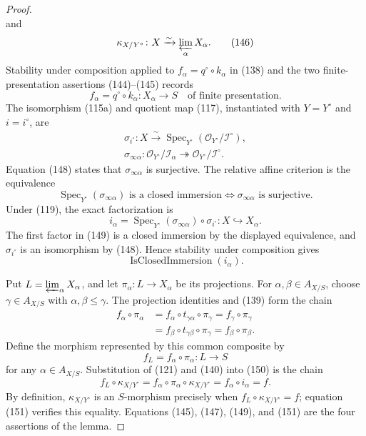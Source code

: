 \begin{proof}
\[  \]
  and
  \[
    \kappa_{X/Y^\circ}\colon X\xrightarrow{\sim}
      \varprojlim_\alpha X_\alpha.                             \tag{146}
  \]
  Stability under composition applied to
  $f_\alpha=q^\circ\circ k_\alpha$ in (138) and the two
  finite-presentation assertions (144)--(145) records
  \[
    f_\alpha=q^\circ\circ k_\alpha\colon X_\alpha\to S
      \quad\text{of finite presentation}.                      \tag{147}
  \]
  The isomorphism (115a) and quotient map (117), instantiated with
  $Y=Y^\circ$ and $i=i^\circ$, are
  \[
  \begin{gathered}
    \sigma_{i^\circ}\colon X\xrightarrow{\sim}
      \operatorname{Spec}_{Y^\circ}
        (\mathcal O_{Y^\circ}/\mathcal I^\circ),\\
    \sigma_{\infty\alpha}\colon
      \mathcal O_{Y^\circ}/\mathcal I_\alpha
      \twoheadrightarrow\mathcal O_{Y^\circ}/\mathcal I^\circ.
  \end{gathered}                                                  \tag{148}
  \]
  Equation (148) states that $\sigma_{\infty\alpha}$ is surjective.  The
  relative affine criterion is the equivalence
  \[
    \operatorname{Spec}_{Y^\circ}(\sigma_{\infty\alpha})
      \text{ is a closed immersion}
      \Longleftrightarrow
    \sigma_{\infty\alpha}\text{ is surjective}.
  \]
  Under (119), the exact factorization is
  \[
    i_\alpha
      =\operatorname{Spec}_{Y^\circ}(\sigma_{\infty\alpha})
         \circ\sigma_{i^\circ}\colon X\hookrightarrow X_\alpha. \tag{149}
  \]
  The first factor in (149) is a closed immersion by the displayed
  equivalence, and $\sigma_{i^\circ}$ is an isomorphism by (148).  Hence
  stability under composition gives
  \[
    \operatorname{IsClosedImmersion}(i_\alpha).
  \]

  Put $L=\varprojlim_\alpha X_\alpha$, and let
  $\pi_\alpha\colon L\to X_\alpha$ be its projections.  For
  $\alpha,\beta\in A_{X/S}$, choose
  $\gamma\in A_{X/S}$ with $\alpha,\beta\leq\gamma$.  The projection
  identities and (139) form the chain
  \[
  \begin{aligned}
    f_\alpha\circ\pi_\alpha
      &=f_\alpha\circ t_{\gamma\alpha}\circ\pi_\gamma
       =f_\gamma\circ\pi_\gamma\\
      &=f_\beta\circ t_{\gamma\beta}\circ\pi_\gamma
       =f_\beta\circ\pi_\beta.
  \end{aligned}
  \]
  Define the morphism represented by this common composite by
  \[
    f_L=f_\alpha\circ\pi_\alpha\colon L\to S                    \tag{150}
  \]
  for any $\alpha\in A_{X/S}$.  Substitution of (121) and (140) into (150)
  is the chain
  \[
    f_L\circ\kappa_{X/Y^\circ}
      =f_\alpha\circ\pi_\alpha\circ\kappa_{X/Y^\circ}
      =f_\alpha\circ i_\alpha
      =f.                                                        \tag{151}
  \]
  By definition, $\kappa_{X/Y^\circ}$ is an $S$-morphism precisely when
  $f_L\circ\kappa_{X/Y^\circ}=f$; equation (151) verifies this equality.
  Equations (145), (147), (149),
  and (151) are the four assertions of the lemma.
\end{proof}


